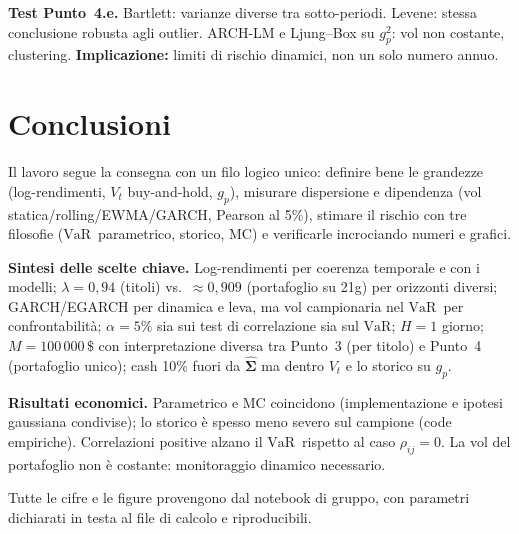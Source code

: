 \documentclass[12pt,a4paper]{article}
\newcommand{\VaR}{\ensuremath{\mathrm{VaR}}}
\newcommand{\USD}{\ensuremath{\,\$}}
\begin{document}
\textbf{Test Punto~4.e.} Bartlett: varianze diverse tra sotto-periodi. Levene: stessa conclusione robusta agli outlier. ARCH-LM e Ljung--Box su $g_p^2$: vol non costante, clustering. \textbf{Implicazione:} limiti di rischio dinamici, non un solo numero annuo.

\section{Conclusioni}

Il lavoro segue la consegna con un filo logico unico: definire bene le grandezze (log-rendimenti, $V_t$ buy-and-hold, $g_p$), misurare dispersione e dipendenza (vol statica/rolling/EWMA/GARCH, Pearson al 5\%), stimare il rischio con tre filosofie (\VaR\ parametrico, storico, MC) e verificarle incrociando numeri e grafici.

\textbf{Sintesi delle scelte chiave.} Log-rendimenti per coerenza temporale e con i modelli; $\lambda=0{,}94$ (titoli) vs.\ $\approx 0{,}909$ (portafoglio su 21g) per orizzonti diversi; GARCH/EGARCH per dinamica e leva, ma vol campionaria nel \VaR\ per confrontabilità; $\alpha=5\%$ sia sui test di correlazione sia sul \VaR; $H=1$ giorno; $M=100\,000\USD$ con interpretazione diversa tra Punto~3 (per titolo) e Punto~4 (portafoglio unico); cash 10\% fuori da $\hat{\boldsymbol\Sigma}$ ma dentro $V_t$ e lo storico su $g_p$.

\textbf{Risultati economici.} Parametrico e MC coincidono (implementazione e ipotesi gaussiana condivise); lo storico è spesso meno severo sul campione (code empiriche). Correlazioni positive alzano il \VaR\ rispetto al caso $\rho_{ij}=0$. La vol del portafoglio non è costante: monitoraggio dinamico necessario.

Tutte le cifre e le figure provengono dal notebook di gruppo, con parametri dichiarati in testa al file di calcolo e riproducibili.
\end{document}
